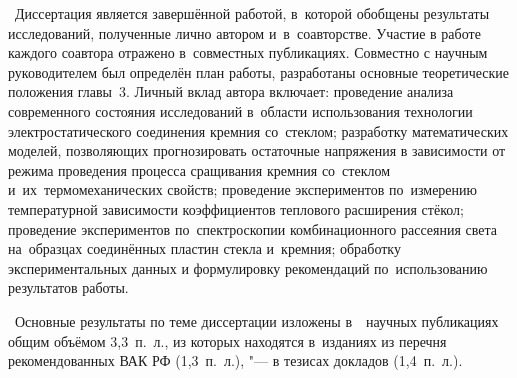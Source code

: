 \contribution\ Диссертация является завершённой работой, в~которой обобщены
результаты исследований, полученные лично автором и~в~соавторстве.
Участие в работе каждого соавтора отражено в~совместных публикациях.
Совместно с научным руководителем был определён план работы,
разработаны основные теоретические положения главы~3.
Личный вклад автора включает:
проведение анализа современного состояния исследований
в~области использования технологии электростатического соединения кремния
со~стеклом;
разработку математических моделей, позволяющих прогнозировать
остаточные напряжения в зависимости от режима проведения
процесса сращивания кремния со~стеклом
и~их~термомеханических свойств;
проведение экспериментов по~измерению температурной
зависимости коэффициентов теплового расширения стёкол;
проведение экспериментов по~спектроскопии комбинационного рассеяния
света на~образцах соединённых пластин стекла и~кремния;
обработку экспериментальных данных
и формулировку рекомендаций по~использованию результатов работы.

    \begin{refsection}%
        \printbibliography[heading=countauthornotvak, env=countauthornotvak, keyword=biblioauthornotvak, section=1]%
        \printbibliography[heading=countauthorvak, env=countauthorvak, keyword=biblioauthorvak, section=1]%
        \printbibliography[heading=countauthorconf, env=countauthorconf, keyword=biblioauthorconf, section=1]%
        \printbibliography[heading=countauthor, env=countauthor, keyword=biblioauthor, section=1]%
        \publications\ Основные результаты по теме диссертации изложены в~~научных публикациях\nocite{Sinev_Ryabov_Tinyakov_nano2011, Sinev_osoben_primen_inzh_vest201408}
        общим объёмом 3,3~п.~л.,
         из которых находятся в~изданиях из перечня
        рекомендованных ВАК РФ\nocite{Sinev_Ryabov_NMST_2011, Sinev_Ryabov_rasch_coef_napr_nmst2014, Sinev_technomag2014, Sinev_Petrov2016_cte_glass} (1,3~п.~л.),
         "--- в тезисах докладов\nocite{sinev2008molodezh, sinev2010otsenka_vniia, sinev2013primenenie_vniia, sinev2014molodezh, sinev2015niiis, sinev2016issledovanie_vniia} (1,4~п.~л.).%
    \end{refsection}
    \begin{refsection}%
        \printbibliography[heading=countauthorvak, env=countauthorvak, keyword=biblioauthorvak, section=2]%
        \printbibliography[heading=countauthornotvak, env=countauthornotvak, keyword=biblioauthornotvak, section=2]%
        \printbibliography[heading=countauthorconf, env=countauthorconf, keyword=biblioauthorconf, section=2]%
        \printbibliography[heading=countauthor, env=countauthor, keyword=biblioauthor, section=2]%
        \nocite{Sinev_Ryabov_NMST_2011, Sinev_Ryabov_rasch_coef_napr_nmst2014, Sinev_technomag2014, Sinev_Petrov2016_cte_glass}%
        \nocite{Sinev_Ryabov_Tinyakov_nano2011, Sinev_osoben_primen_inzh_vest201408}%
        \nocite{sinev2008molodezh, sinev2015niiis}%
    \end{refsection}
